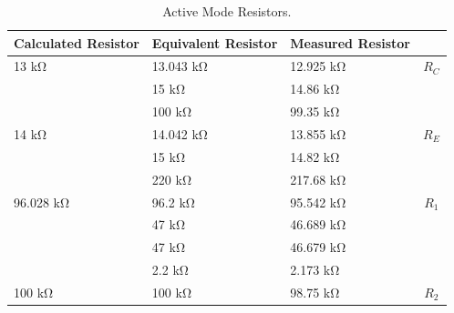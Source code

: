 \documentclass{../../ece-report}
\begin{document}
\begin{table}[h!]
  \centering
  \begin{tabular}{l l l c}\toprule
    \textbf{Calculated Resistor} & \textbf{Equivalent Resistor} & \textbf{Measured Resistor} & \\
    \midrule

13 \si{\kohm} & 13.043 \si{\kohm} & 12.925 \si{\kohm} & $R_C$ \\
          & 15 \si{\kohm}    & 14.86   \si{\kohm}  &       \\
          & 100 \si{\kohm}    & 99.35   \si{\kohm}  &       \\
          \midrule
14 \si{\kohm}    & 14.042 \si{\kohm}    & 13.855 \si{\kohm}    & $R_E$ \\
          & 15 \si{\kohm}    & 14.82   \si{\kohm}  &       \\
          & 220 \si{\kohm}    & 217.68   \si{\kohm}  &       \\
          \midrule
96.028 \si{\kohm}     & 96.2 \si{\kohm}     & 95.542 \si{\kohm}  & $R_1$ \\
          & 47 \si{\kohm}     & 46.689 \si{\kohm}   &       \\
          & 47 \si{\kohm}     & 46.679 \si{\kohm}   &       \\
          & 2.2 \si{\kohm}    &  2.173 \si{\kohm}   &       \\
\midrule
100 \si{\kohm}     & 100 \si{\kohm}     & 98.75 \si{\kohm}  & $R_2$ \\
\bottomrule
\end{tabular}
\caption{Active Mode Resistors.}
\label{tab:sat_resistors}
\end{table}
\end{document}

